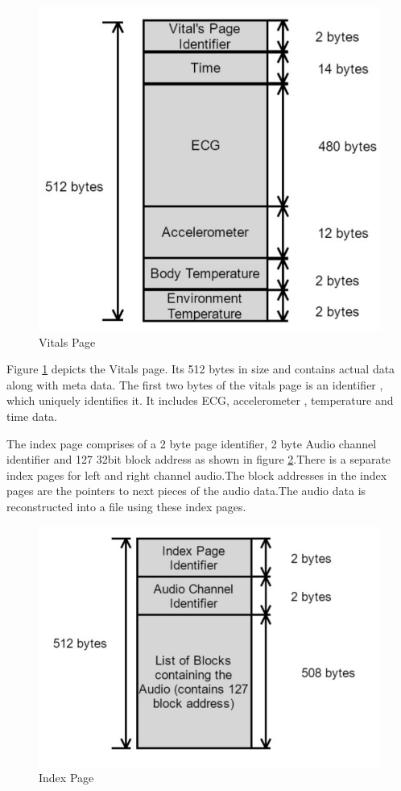 \begin{figure}[h]
	\centering
	\includegraphics[scale = 0.5 ]{vital_page.JPG}
	\caption{Vitals Page\label{vital_page}}
\end{figure}


 Figure \ref{vital_page} depicts the Vitals page. Its 512 bytes in size and contains actual data along with meta data. The first two bytes of the vitals page is an identifier , which uniquely identifies it. It includes ECG, accelerometer , temperature and time data. 


The index page comprises of a 2 byte page identifier, 2 byte Audio channel identifier and 127 32bit block address as shown in figure \ref{index_page}.There is a separate index pages for left and right channel audio.The block addresses in the index pages are the pointers to next pieces of the audio data.The audio data is reconstructed into a file using these index pages.
 
\begin{figure}[h]
	\centering
	\includegraphics[scale = 0.5 ]{index_page.JPG}
	\caption{Index Page\label{index_page}}
\end{figure}

